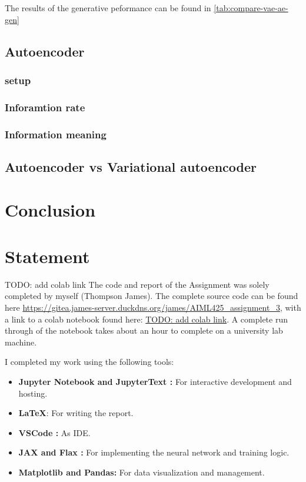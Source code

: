 \documentclass[conference,a4paper]{IEEEtran}
\begin{document}
The results of the generative peformance can be found in \ref{tab:compare-vae-ae-gen}

\subsection{Autoencoder}


\subsubsection{setup}

\subsubsection{Inforamtion rate}

\subsubsection{Information meaning}

\subsection{Autoencoder vs Variational autoencoder}


\section{Conclusion}

\newpage
\section*{Statement}

TODO: add colab link
The code and report of the Assignment was solely completed by myself (Thompson James). The complete source code can be found here \url{https://gitea.james-server.duckdns.org/james/AIML425\_assignment\_3}, with a link to a colab notebook found here: \url{TODO: add colab link}. A complete run through of the notebook takes about an hour to complete on a university lab machine.

I completed my work using the following tools:
\begin{itemize}
    \item \textbf{Jupyter Notebook \cite{Kluyver2016jupyter} and JupyterText \cite{woutsMwoutsJupytext2025}:} For interactive development and hosting.
    \item \textbf{\LaTeX}: For writing the report.
    \item \textbf{VSCode \cite{MicrosoftVscode2025}:} As IDE.
    \item \textbf{JAX \cite{jax2018github} and Flax \cite{flax2020github}:} For implementing the neural network and training logic.
    \item \textbf{Matplotlib\cite{Hunter:2007} and Pandas\cite{thepandasdevelopmentteamPandasdevPandasPandas}:} For data visualization and management.
\end{itemize}
\end{document}
